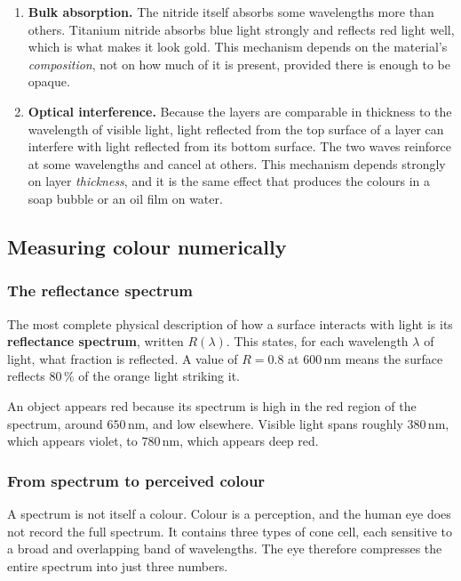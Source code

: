 \documentclass[11pt,a4paper]{article}
\newcommand{\nm}{\ensuremath{\,\mathrm{nm}}}
\begin{document}
\begin{enumerate}[leftmargin=1.5em, itemsep=4pt]
\item \textbf{Bulk absorption.} The nitride itself absorbs some wavelengths
more than others. Titanium nitride absorbs blue light strongly and reflects red
light well, which is what makes it look gold. This mechanism depends on the
material's \emph{composition}, not on how much of it is present, provided there
is enough to be opaque.
\item \textbf{Optical interference.} Because the layers are comparable in
thickness to the wavelength of visible light, light reflected from the top
surface of a layer can interfere with light reflected from its bottom surface.
The two waves reinforce at some wavelengths and cancel at others. This
mechanism depends strongly on layer \emph{thickness}, and it is the same effect
that produces the colours in a soap bubble or an oil film on water.
\end{enumerate}

\subsection{Measuring colour numerically}

\subsubsection{The reflectance spectrum}

The most complete physical description of how a surface interacts with light is
its \textbf{reflectance spectrum}, written $R(\lambda)$. This states, for each
wavelength $\lambda$ of light, what fraction is reflected. A value of $R = 0.8$
at $600\nm$ means the surface reflects 80\,\% of the orange light striking it.

An object appears red because its spectrum is high in the red region of the
spectrum, around $650\nm$, and low elsewhere. Visible light spans roughly
$380\nm$, which appears violet, to $780\nm$, which appears deep red.

\subsubsection{From spectrum to perceived colour}

A spectrum is not itself a colour. Colour is a perception, and the human eye
does not record the full spectrum. It contains three types of cone cell, each
sensitive to a broad and overlapping band of wavelengths. The eye therefore
compresses the entire spectrum into just three numbers.
\end{document}
